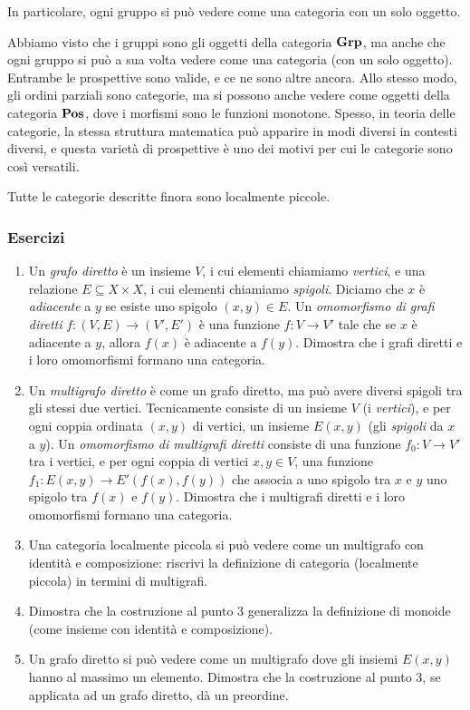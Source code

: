 In particolare, ogni gruppo si può vedere come una categoria con un solo oggetto. 

\begin{remark}
 Abbiamo visto che i gruppi sono gli oggetti della categoria $\mathbf{Grp}$, ma anche che ogni gruppo si può a sua volta vedere come una categoria (con un solo oggetto). Entrambe le prospettive sono valide, e ce ne sono altre ancora. 
 Allo stesso modo, gli ordini parziali sono categorie, ma si possono anche vedere come oggetti della categoria $\mathbf{Pos}$, dove i morfismi sono le funzioni monotone. 
 Spesso, in teoria delle categorie, la stessa struttura matematica può apparire in modi diversi in contesti diversi, e questa varietà di prospettive è uno dei motivi per cui le categorie sono così versatili. 
\end{remark}


Tutte le categorie descritte finora sono localmente piccole. 

\subsubsection*{Esercizi}
\begin{enumerate}
    \item Un \emph{grafo diretto} è un insieme $V$, i cui elementi chiamiamo \emph{vertici}, e una relazione $E\subseteq X\times X$, i cui elementi chiamiamo \emph{spigoli}. Diciamo che $x$ è \emph{adiacente} a $y$ se esiste uno spigolo $(x,y)\in E$. Un \emph{omomorfismo di grafi diretti} $f:(V,E)\to (V',E')$ è una funzione $f:V\to V'$ tale che se $x$ è adiacente a $y$, allora $f(x)$ è adiacente a $f(y)$. Dimostra che i grafi diretti e i loro omomorfismi formano una categoria. 
    \item Un \emph{multigrafo diretto} è come un grafo diretto, ma può avere diversi spigoli tra gli stessi due vertici. Tecnicamente consiste di un insieme $V$ (i \emph{vertici}), e per ogni coppia ordinata $(x,y)$ di vertici, un insieme $E(x,y)$ (gli \emph{spigoli} da $x$ a $y$). Un \emph{omomorfismo di multigrafi diretti} consiste di una funzione $f_0:V\to V'$ tra i vertici, e per ogni coppia di vertici $x,y\in V$, una funzione $f_1:E(x,y)\to E'(f(x),f(y))$ che associa a uno spigolo tra $x$ e $y$ uno spigolo tra $f(x)$ e $f(y)$. Dimostra che i multigrafi diretti e i loro omomorfismi formano una categoria. 
    \item Una categoria localmente piccola si può vedere come un multigrafo con identità e composizione: riscrivi la definizione di categoria (localmente piccola) in termini di multigrafi. 
    \item Dimostra che la costruzione al punto 3 generalizza la definizione di monoide (come insieme con identità e composizione).
    \item Un grafo diretto si può vedere come un multigrafo dove gli insiemi $E(x,y)$ hanno al massimo un elemento. Dimostra che la costruzione al punto 3, se applicata ad un grafo diretto, dà un preordine. 
\end{enumerate}


